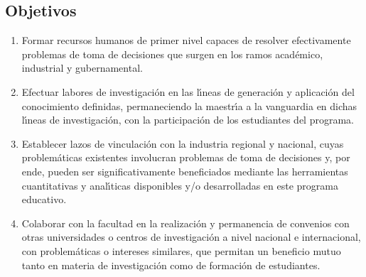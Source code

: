 \documentclass{article}
\begin{document}
\subsection{Objetivos}

\begin{enumerate}
\item{Formar recursos humanos de primer nivel capaces de resolver
    efectivamente problemas de toma de decisiones que surgen en los
    ramos acad\'{e}mico, industrial y gubernamental.}
\item{Efectuar labores de investigaci\'{o}n en las l\'{\i}neas de generaci\'{o}n y
    aplicaci\'{o}n del conocimiento definidas, permaneciendo la maestr\'{\i}a a
    la vanguardia en dichas l\'{\i}neas de investigaci\'{o}n, con la
    participaci\'{o}n de los estudiantes del programa.}
  \item{Establecer lazos de vinculaci\'{o}n con la industria regional y
      nacional, cuyas problem\'{a}ticas existentes involucran problemas de
      toma de decisiones y, por ende, pueden ser significativamente
      beneficiados mediante las herramientas cuantitativas y
      anal\'{\i}ticas disponibles y/o desarrolladas en este programa
      educativo.}
\item{Colaborar con la facultad en la realizaci\'{o}n y permanencia de
    convenios con otras universidades o centros de investigaci\'{o}n a
    nivel nacional e internacional, con problem\'{a}ticas o intereses
    similares, que permitan un beneficio mutuo tanto en materia de
    investigaci\'{o}n como de formaci\'{o}n de estudiantes.}
\end{enumerate}
\end{document}
